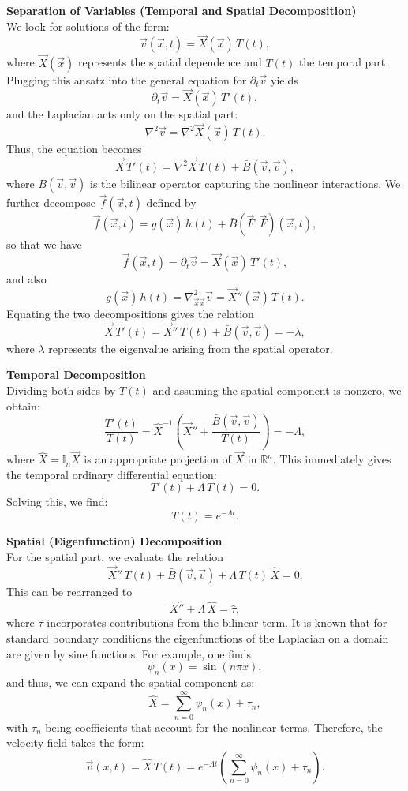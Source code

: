 \documentclass[12pt]{article}
\begin{document}
\textbf{Separation of Variables (Temporal and Spatial Decomposition)}\\[1mm]
We look for solutions of the form:
\[
\vec{v}(\vec{x}, t) = \vec{X}(\vec{x}) \, T(t),
\]
where \(\vec{X}(\vec{x})\) represents the spatial dependence and \(T(t)\) the temporal part. Plugging this ansatz into the general equation for \(\partial_{t}\vec{v}\) yields
\[
\partial_{t}\vec{v} = \vec{X}(\vec{x}) \, T'(t),
\]
and the Laplacian acts only on the spatial part:
\[
\nabla^{2} \vec{v} = \nabla^{2} \vec{X}(\vec{x}) \, T(t).
\]
Thus, the equation becomes
\[
\vec{X} \, T'(t) = \nabla^{2}\vec{X}\, T(t) + \bar{B}(\vec{v}, \vec{v}),
\]
where \(\bar{B}(\vec{v}, \vec{v})\) is the bilinear operator capturing the nonlinear interactions. We further decompose \(\vec{f}(\vec{x}, t)\) defined by
\[
\vec{f}(\vec{x}, t) = g(\vec{x})\, h(t) + \bar{B}(\vec{F}, \vec{F})(\vec{x}, t),
\]
so that we have
\[
\vec{f}(\vec{x},t) = \partial_{t}\vec{v} = \vec{X}(\vec{x})\, T'(t),
\]
and also
\[
g(\vec{x})\, h(t) = \nabla^{2}_{\vec{x}\vec{x}} \vec{v} = \vec{X}''(\vec{x})\, T(t).
\]
Equating the two decompositions gives the relation
\[
\vec{X} \, T'(t) = \vec{X}'' \, T(t) + \bar{B}(\vec{v}, \vec{v}) = -\lambda,
\]
where \(\lambda\) represents the eigenvalue arising from the spatial operator.

\bigskip

\textbf{Temporal Decomposition}\\[1mm]
Dividing both sides by \(T(t)\) and assuming the spatial component is nonzero, we obtain:
\[
\frac{T'(t)}{T(t)} = \hat{X}^{-1}\left( \vec{X}'' + \frac{\bar{B}(\vec{v}, \vec{v})}{T(t)} \right) = -\Lambda,
\]
where \(\hat{X} = \mathbb{I}_{n}\vec{X}\) is an appropriate projection of \(\vec{X}\) in \(\mathbb{R}^{n}\). This immediately gives the temporal ordinary differential equation:
\[
T'(t) + \Lambda \, T(t) = 0.
\]
Solving this, we find:
\[
T(t) = e^{-\Lambda t}.
\]

\bigskip

\textbf{Spatial (Eigenfunction) Decomposition}\\[1mm]
For the spatial part, we evaluate the relation
\[
\vec{X}'' \, T(t) + \bar{B}(\vec{v}, \vec{v}) + \Lambda\, T(t) \, \hat{X} = 0.
\]
This can be rearranged to
\[
\vec{X}'' + \Lambda\, \hat{X} = \hat{\tau},
\]
where \(\hat{\tau}\) incorporates contributions from the bilinear term. It is known that for standard boundary conditions the eigenfunctions of the Laplacian on a domain are given by sine functions. For example, one finds
\[
\psi_{n}(x) = \sin(n\pi x),
\]
and thus, we can expand the spatial component as:
\[
\hat{X} = \sum_{n=0}^{\infty} \psi_{n}(x) + \tau_{n},
\]
with \(\tau_{n}\) being coefficients that account for the nonlinear terms. Therefore, the velocity field takes the form:
\[
\vec{v}(x,t) = \hat{X} \, T(t) = e^{-\Lambda t} \left( \sum_{n=0}^{\infty} \psi_{n}(x) + \tau_{n} \right).
\]
\end{document}
